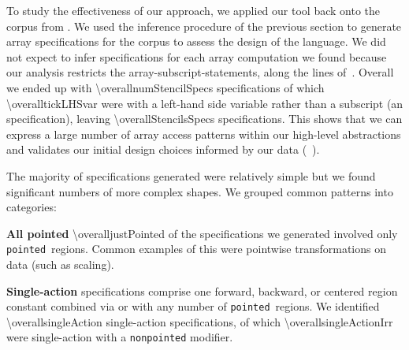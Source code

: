 
\newcommand\regname[1]{\texttt{#1}}
\newcommand\pointed{\regname{pointed}}
\newcommand\forward{\regname{forward}}

\noindent
To study the effectiveness of our approach, we applied our tool back
onto the corpus from .  We used the inference
procedure of the previous section to generate array specifications
for the corpus to assess the design of the language.
%
%
We did not expect to infer specifications for each array computation
we found because our analysis restricts the
array-subscript-statements, along the lines of~.
Overall we ended up with
\num{\overallnumStencilSpecs} specifications of which
\num{\overalltickLHSvar} were with a left-hand side variable rather
than a subscript (an  specification), leaving
\num{\overallStencilsSpecs}  specifications.
%
This shows that we can express a large number of
array access patterns within our high-level abstractions and validates our
initial design choices informed by our data (~).

The majority of specifications generated were relatively simple but we
found significant numbers of more complex shapes. We grouped common
patterns into categories:

\textbf{All pointed} \num{\overalljustPointed} of the specifications we
generated involved only \pointed\ regions.
Common examples of this were pointwise transformations on data (such
as scaling).

\textbf{Single-action} specifications comprise one
forward, backward, or centered region constant combined via \term{+}
or \term{*} with any number of \pointed\ regions. We identified \num{\overallsingleAction} single-action
specifications, of which \num{\overallsingleActionIrr} were single-action with a
\texttt{nonpointed} modifier.

